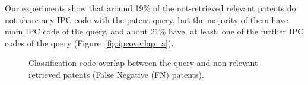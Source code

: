 Our experiments show that   
around 19\% of the not-retrieved relevant patents do not share any IPC code with the patent query, but the majority of them have main IPC code of the query, and about 21\% have, at least, one of the further IPC codes of the query (Figure~\ref{fig:ipcoverlap_a}). 
\begin{figure}[t!]
\begin{centering}
\hspace*{0.5cm}   

\par\end{centering} 
\protect\caption{Classification code overlap between the query and non-relevant retrieved patents (False Negative (FN) patents).}
\label{fig:ipcoverlap}
\end{figure}
